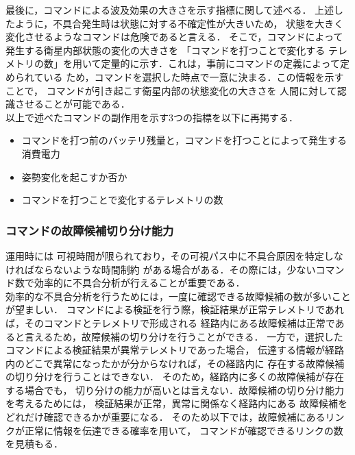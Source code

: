 \documentclass[11pt]{article}
\begin{document}
最後に，コマンドによる波及効果の大きさを示す指標に関して述べる．
上述したように，不具合発生時は状態に対する不確定性が大きいため，
状態を大きく変化させるようなコマンドは危険であると言える．
そこで，コマンドによって発生する衛星内部状態の変化の大きさを
「コマンドを打つことで変化する
テレメトリの数」を用いて定量的に示す．これは，事前にコマンドの定義によって定められている
ため，コマンドを選択した時点で一意に決まる．この情報を示すことで，
コマンドが引き起こす衛星内部の状態変化の大きさを
人間に対して認識させることが可能である．\\
以上で述べたコマンドの副作用を示す3つの指標を以下に再掲する．
\begin{itemize}
   \item コマンドを打つ前のバッテリ残量と，コマンドを打つことによって発生する消費電力
   \item 姿勢変化を起こすか否か
   \item コマンドを打つことで変化するテレメトリの数
\end{itemize}

\subsubsection{コマンドの故障候補切り分け能力}
運用時には
可視時間が限られており，その可視パス中に不具合原因を特定しなければならないような時間制約
がある場合がある．その際には，少ないコマンド数で効率的に不具合分析が行えることが重要である．\\
効率的な不具合分析を行うためには，一度に確認できる故障候補の数が多いことが望ましい．
コマンドによる検証を行う際，検証結果が正常テレメトリであれば，そのコマンドとテレメトリで形成される
経路内にある故障候補は正常であると言えるため，故障候補の切り分けを行うことができる．
一方で，選択したコマンドによる検証結果が異常テレメトリであった場合，
伝達する情報が経路内のどこで異常になったかが分からなければ，その経路内に
存在する故障候補の切り分けを行うことはできない．
そのため，経路内に多くの故障候補が存在する場合でも，
切り分けの能力が高いとは言えない．故障候補の切り分け能力を考えるためには，
検証結果が正常，異常に関係なく経路内にある
故障候補をどれだけ確認できるかが重要になる．
そのため以下では，故障候補にあるリンクが正常に情報を伝達できる確率を用いて，
コマンドが確認できるリンクの数を見積もる．
\end{document}
